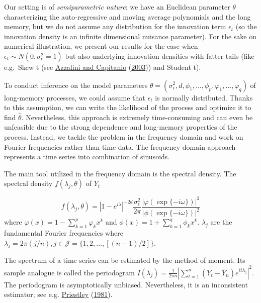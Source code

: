 \documentclass[
  11pt,
]{article}
\begin{document}
Our setting is of \emph{semiparametric nature}: we have an Euclidean
parameter \(\theta\) characterizing the auto-regressive and moving
average polynomials and the long memory, but we do not assume any
distribution for the innovation term \(\epsilon_{t}\) (so the innovation
density is an infinite dimensional nuisance parameter). For the sake on
numerical illustration, we present our results for the case when
\(\epsilon_{t} \sim N\left(0, \sigma_{\epsilon}^{2}=1\right)\) but also
underlying innovation densities with fatter tails (like e.g.~Skew t (see
\protect\hyperlink{ref-azzalini2003distributions}{Azzalini and
Capitanio} (\protect\hyperlink{ref-azzalini2003distributions}{2003}))
and Student t).

To conduct inference on the model parameters
\(\theta=\left(\sigma_{\epsilon}^{2}, d, \phi_{1}, \ldots, \phi_{p}, \varphi_{1}, \ldots, \varphi_{q}\right)\)
of long-memory processes, we could assume that \(\epsilon_t\) is
normally distributed. Thanks to this assumption, we can write the
likelihood of the process and optimize it to find \(\hat \theta\).
Nevertheless, this approach is extremely time-consuming and can even be
unfeasible due to the strong dependence and long-memory properties of
the process. Instead, we tackle the problem in the frequency domain and
work on Fourier frequencies rather than time data. The frequency domain
approach represents a time series into combination of sinusoids.

The main tool utilized in the frequency domain is the spectral density.
The spectral density \(f(\lambda_j, \theta)\) of \(Y_t\)

\[
f(\lambda_j, \theta)=\left|1-e^{i \lambda}\right|^{-2 d}\frac{\sigma_{\epsilon}^{2}}{2 \pi} \frac{|\varphi(\exp \{-i \omega\})|^{2}}{|\phi(\exp \{-i \omega\})|^{2}}
\] where \(\varphi(x)=1-\sum_{k=1}^{p} \varphi_{k} x^{k}\) and
\(\phi(x)=1+\sum_{k=1}^{q} \phi_{k} x^{k}\). \(\lambda_j\) are the
fundamental Fourier frequencies where
\(\lambda_j=2 \pi(j / n), j \in \mathcal{J}=\{1,2, \ldots,[(n-1) / 2]\}\).

The spectrum of a time series can be estimated by the method of moment.
Its sample analogue is called the periodogram
\(I\left(\lambda_{j}\right)=\frac{1}{2 \pi n}\left|\sum_{t=1}^{n}\left(Y_{t}-\bar{Y}_{n}\right) e^{i t \lambda_{j}}\right|^{2}\).
The periodogram is asymptotically unbiased. Nevertheless, it is an
inconsistent estimator; see e.g.
\protect\hyperlink{ref-priestley1981spectral}{Priestley}
(\protect\hyperlink{ref-priestley1981spectral}{1981}).
\end{document}
